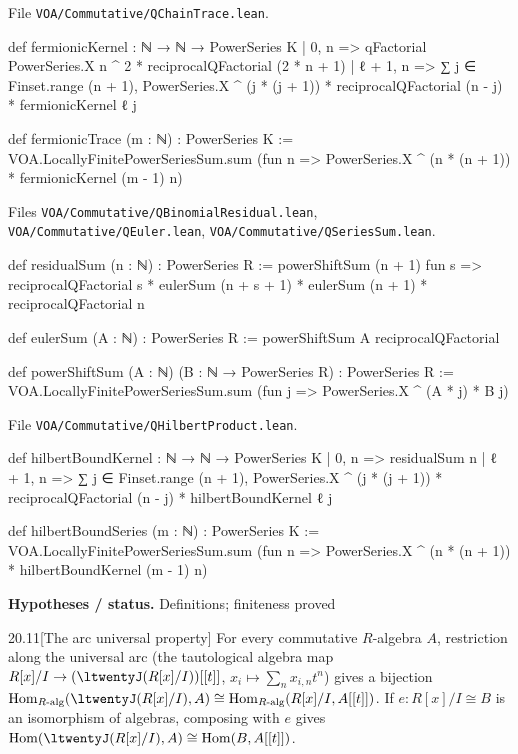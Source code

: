 \documentclass[11pt,openany]{book}
\newcommand{\leanpath}[1]{\texttt{\small #1}}
\theoremstyle{definition}
\theoremstyle{plain}
\begin{document}
{\raggedright\noindent File \leanpath{VOA/\allowbreak Commutative/\allowbreak QChainTrace.lean}.\par}
\begin{leancode}
def fermionicKernel : ℕ → ℕ → PowerSeries K
  | 0, n => qFactorial PowerSeries.X n ^ 2 * reciprocalQFactorial (2 * n + 1)
  | ℓ + 1, n => ∑ j ∈ Finset.range (n + 1),
      PowerSeries.X ^ (j * (j + 1)) * reciprocalQFactorial (n - j) * fermionicKernel ℓ j

def fermionicTrace (m : ℕ) : PowerSeries K :=
  VOA.LocallyFinitePowerSeriesSum.sum (fun n =>
    PowerSeries.X ^ (n * (n + 1)) * fermionicKernel (m - 1) n)
\end{leancode}
{\raggedright\noindent Files \leanpath{VOA/\allowbreak Commutative/\allowbreak QBinomialResidual.lean},
\leanpath{VOA/\allowbreak Commutative/\allowbreak QEuler.lean},
\leanpath{VOA/\allowbreak Commutative/\allowbreak QSeriesSum.lean}.\par}
\begin{leancode}
def residualSum (n : ℕ) : PowerSeries R :=
  powerShiftSum (n + 1) fun s =>
    reciprocalQFactorial s * eulerSum (n + s + 1) *
      eulerSum (n + 1) * reciprocalQFactorial n

def eulerSum (A : ℕ) : PowerSeries R :=
  powerShiftSum A reciprocalQFactorial

def powerShiftSum (A : ℕ) (B : ℕ → PowerSeries R) : PowerSeries R :=
  VOA.LocallyFinitePowerSeriesSum.sum (fun j => PowerSeries.X ^ (A * j) * B j)
\end{leancode}
{\raggedright\noindent File \leanpath{VOA/\allowbreak Commutative/\allowbreak QHilbertProduct.lean}.\par}
\begin{leancode}
def hilbertBoundKernel : ℕ → ℕ → PowerSeries K
  | 0, n => residualSum n
  | ℓ + 1, n => ∑ j ∈ Finset.range (n + 1),
      PowerSeries.X ^ (j * (j + 1)) * reciprocalQFactorial (n - j) * hilbertBoundKernel ℓ j

def hilbertBoundSeries (m : ℕ) : PowerSeries K :=
  VOA.LocallyFinitePowerSeriesSum.sum (fun n =>
    PowerSeries.X ^ (n * (n + 1)) * hilbertBoundKernel (m - 1) n)
\end{leancode}
\noindent\textbf{Hypotheses / status.} Definitions; finiteness proved\par
\medskip
\begin{btheorem}{20.11}[The arc universal property]
For every commutative $R$-algebra $A$, restriction along the universal arc (the tautological algebra map
$R[x]/I\to(\ltwentyJ(R[x]/I))[[t]]$, $x_i\mapsto\sum_nx_{i,n}t^n$) gives a bijection
$\operatorname{Hom}_{R\text{-alg}}(\ltwentyJ(R[x]/I),A)\cong\operatorname{Hom}_{R\text{-alg}}(R[x]/I,A[[t]])$.
If $e\colon R[x]/I\cong B$ is an isomorphism of algebras, composing with $e$ gives
$\operatorname{Hom}(\ltwentyJ(R[x]/I),A)\cong\operatorname{Hom}(B,A[[t]])$.
\end{btheorem}
\end{document}
